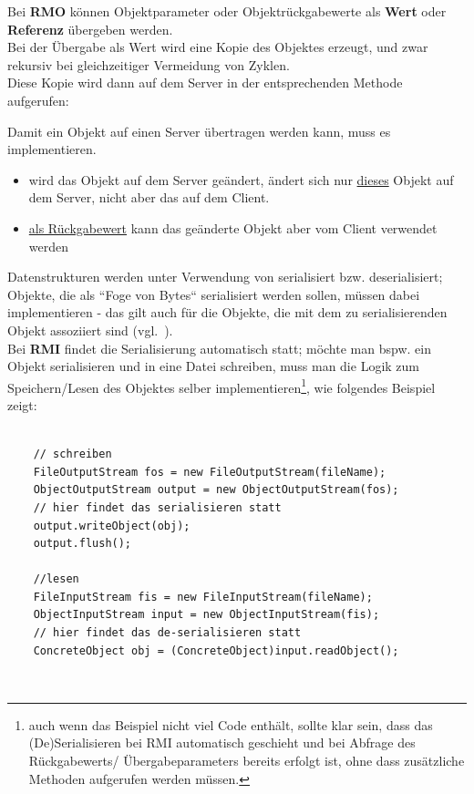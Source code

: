 Bei \textbf{RMO} können Objektparameter oder Objektrückgabewerte als \textbf{Wert} oder \textbf{Referenz} übergeben werden.\\

\noindent
Bei der Übergabe als Wert wird eine Kopie des Objektes erzeugt, und zwar rekursiv bei gleichzeitiger Vermeidung von Zyklen.\\

\noindent
Diese Kopie wird dann auf dem Server in der entsprechenden Methode aufgerufen:

\begin{tcolorbox}[enlarge top by=0.5cm,enlarge bottom by=0.5cm]
    Damit ein Objekt auf einen Server übertragen werden kann, muss es  implementieren.
\end{tcolorbox}

\begin{itemize}
    \item wird das Objekt auf dem Server geändert, ändert sich nur \ul{dieses} Objekt auf dem Server, nicht aber das auf dem Client.
    \item \ul{als Rückgabewert} kann das geänderte Objekt aber vom Client verwendet werden
\end{itemize}

Datenstrukturen werden unter Verwendung von  serialisiert {bzw.} deserialisiert; Objekte, die als ``Foge von Bytes`` serialisiert werden sollen, müssen dabei  implementieren  - das gilt auch für die Objekte, die mit dem zu serialisierenden Objekt assoziiert sind (vgl.~\cite[332]{Oec22}).\\

\noindent
Bei \textbf{RMI} findet die Serialisierung automatisch statt; möchte man {bspw.} ein Objekt serialisieren und in eine Datei schreiben, muss man die Logik zum Speichern/Lesen des Objektes selber implementieren\footnote{
auch wenn das Beispiel nicht viel Code enthält, sollte klar sein, dass das (De)Serialisieren bei RMI automatisch geschieht und bei Abfrage des Rückgabewerts/ Übergabeparameters bereits erfolgt ist, ohne dass zusätzliche Methoden aufgerufen werden müssen.
}, wie folgendes Beispiel zeigt:\\

\begin{verbatim}

    // schreiben
    FileOutputStream fos = new FileOutputStream(fileName);
    ObjectOutputStream output = new ObjectOutputStream(fos);
    // hier findet das serialisieren statt
    output.writeObject(obj);
    output.flush();

    //lesen
    FileInputStream fis = new FileInputStream(fileName);
    ObjectInputStream input = new ObjectInputStream(fis);
    // hier findet das de-serialisieren statt
    ConcreteObject obj = (ConcreteObject)input.readObject();
\end{verbatim}\\


